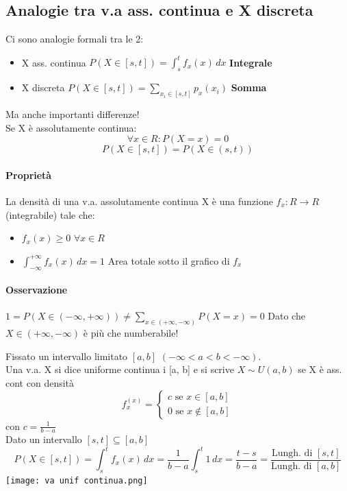 \documentclass[12pt, a4paper, openany]{book}
\begin{document}
\subsection*{Analogie tra v.a ass. continua e X discreta}
Ci sono analogie formali tra le 2: \begin{itemize}
    \item X ass. continua $P(X \in [s, t]) = \int_{s}^{t} f_x (x) \,dx$ \textbf{Integrale}
    \item X discreta $P(X \in [s, t]) = \sum_{x_i \in [s,t]}p_x (x_i)$ \textbf{Somma}
\end{itemize}
Ma anche importanti differenze!
\\ Se X è assolutamente continua:
\begin{equation*}
    \forall x \in R: P(X=x) = 0
\end{equation*}
\begin{equation*}
    P(X \in [s,t]) = P(X \in (s, t))
\end{equation*}
\paragraph*{Proprietà} La densità di una v.a. assolutamente continua X è una funzione 
$f_x : R \to R$ (integrabile) tale che: \begin{itemize}
    \item $f_x (x) \geq 0$ $\forall x \in R$
    \item $\int_{-\infty}^{+\infty} f_x (x) \,dx = 1$ Area 
    totale sotto il grafico di $f_x$
\end{itemize}
 \paragraph*{Osservazione} $1 = P(X \in (-\infty, +\infty)) 
 \neq \sum_{x \in (+\infty, -\infty)} P (X = x) = 0$ Dato che $X \in (+\infty, -\infty)$
 è più che numberabile!
 

Fissato un intervallo limitato $[a, b]$ $(-\infty < a < b < -\infty)$.
\\ Una v.a. X si dice uniforme continua i [a, b] e si scrive $X \sim U(a, b)$
se X è ass. cont con densità
\begin{equation*}
    f_x^(x) =
    \begin{cases}
        c \text{ se } x \in [a, b]\\
        0 \text{ se } x \notin [a, b]
    \end{cases} 
\end{equation*}
con $c = \frac{1}{b-a}$
\\ Dato un intervallo $[s, t] \subseteq [a, b]$
\begin{equation*}
    P(X \in [s,t]) = \int_s^t f_x (x) \,dx = 
    \frac{1}{b -a} \int_s^t 1 \,dx = \frac{t-s}{b-a} =
    \frac{\text{Lungh. di } [s,t]}{\text{Lungh. di } [a, b]}
\end{equation*} 
\texttt{[image: va unif continua.png]}
\end{document}
